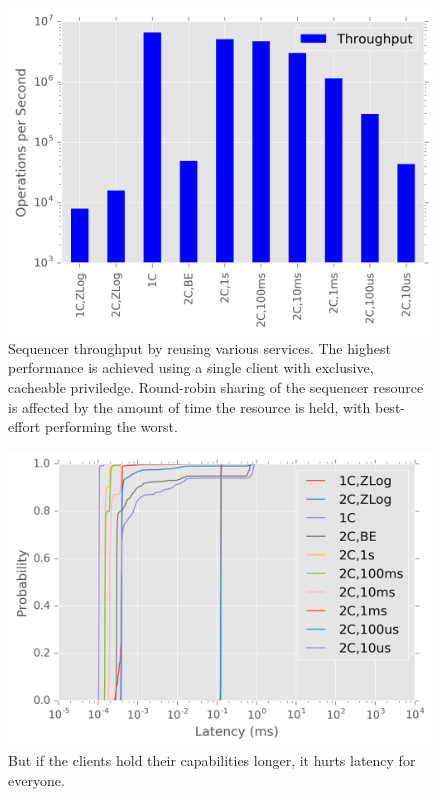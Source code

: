 \documentclass[10pt,twocolumn]{article}
\begin{document}
\begin{figure}[h]
\centering
\includegraphics{figures/caps-delay-thruput.png}
\caption{Sequencer throughput by reusing various services.
The highest performance is achieved using a single client with
exclusive, cacheable priviledge. Round-robin sharing of the sequencer
resource is affected by the amount of time the resource is held,
with best-effort performing the worst.}
\label{fig:captp}
\end{figure}

\begin{figure}[h]
\centering
\includegraphics{figures/caps-delay-latency.png}
\caption{But if the clients hold their capabilities longer, it hurts
latency for everyone.}
\label{fig:capcdf}
\end{figure}
\end{document}
